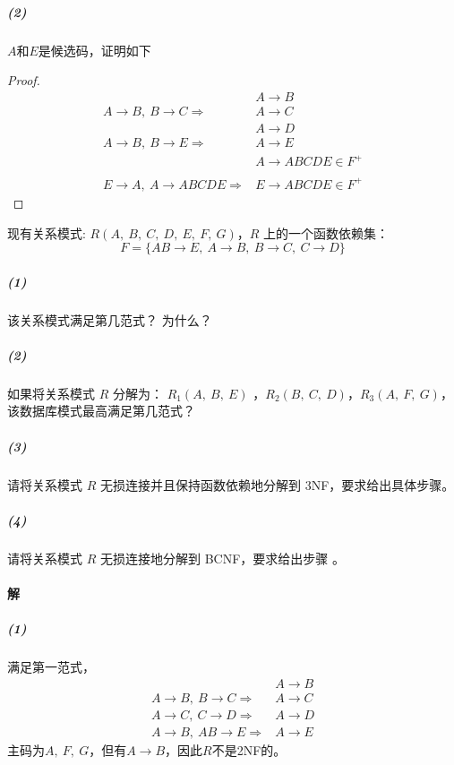 \documentclass{article}
\makeatletter
\renewcommand{\section}{\@startsection{section}{1}{0mm}
                                {-5ex plus -.5ex minus -.2ex}
                                {3ex plus .2ex}
                                {\normalfont\large\bfseries}}
\makeatother
\begin{document}
\subparagraph{(2)}
$A$和$E$是候选码，证明如下
\begin{proof}
    \begin{align*}
                                                          & A \rightarrow B             \\
        A \rightarrow B,\ B \rightarrow C \Rightarrow     & A \rightarrow C             \\
                                                          & A \rightarrow D             \\
        A \rightarrow B,\ B \rightarrow E \Rightarrow     & A \rightarrow E             \\
                                                          & A \rightarrow ABCDE \in F^+ \\
                                                          &                             \\
        E \rightarrow A,\ A \rightarrow ABCDE \Rightarrow & E \rightarrow ABCDE \in F^+
    \end{align*}
\end{proof}


\section{现有关系模式: $R(A,\ B,\ C,\ D,\ E,\ F,\ G)$，$R$ 上的一个函数依赖集：$$F = \{AB \rightarrow E,\ A \rightarrow B,\ B \rightarrow C,\ C \rightarrow D \}$$}
\subparagraph{(1)} 该关系模式满足第几范式？ 为什么？
\subparagraph{(2)} 如果将关系模式 $R$ 分解为： $R_1(A,\ B,\ E)$ ，$R_2(B,\ C,\ D)$，$R_3(A,\ F,\ G)$，该数据库模式最高满足第几范式？
\subparagraph{(3)} 请将关系模式 $R$ 无损连接并且保持函数依赖地分解到 3NF，要求给出具体步骤。
\subparagraph{(4)} 请将关系模式 $R$ 无损连接地分解到 BCNF，要求给出步骤 。

\paragraph{解}
\subparagraph{(1)}
满足第一范式，
\begin{align*}
                                                   & A \rightarrow B \\
    A \rightarrow B,\ B \rightarrow C \Rightarrow  & A \rightarrow C \\
    A \rightarrow C,\ C \rightarrow D \Rightarrow  & A \rightarrow D \\
    A \rightarrow B,\ AB \rightarrow E \Rightarrow & A \rightarrow E
\end{align*}
主码为$A,\ F,\  G$，但有$A \rightarrow B$，因此$R$不是2NF的。
\end{document}
